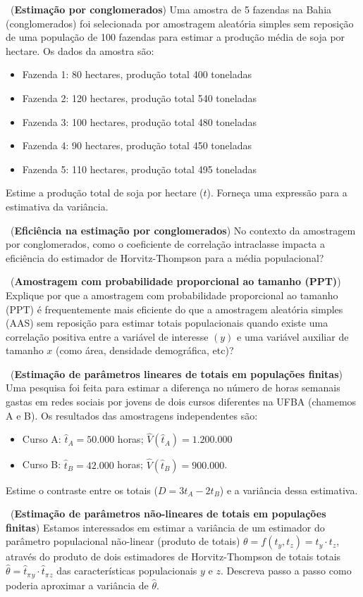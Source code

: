\documentclass[a4paper,12pt,oneside,twocolumn]{Config/milktest}
\begin{document}
\medskip 
\question~({\bf Estimação por conglomerados})
Uma amostra de 5 fazendas na Bahia (conglomerados) foi selecionada por amostragem aleatória simples sem reposição de uma população de 100 fazendas para estimar a produção média de soja por hectare. Os dados da amostra são:
\begin{itemize}
\item Fazenda 1: 80 hectares, produção total 400 toneladas
\item  Fazenda 2: 120 hectares, produção total 540 toneladas
\item Fazenda 3: 100 hectares, produção total 480 toneladas
\item Fazenda 4: 90 hectares, produção total 450 toneladas
\item Fazenda 5: 110 hectares, produção total 495 toneladas
\end{itemize}
Estime a produção total de soja por hectare ($\hat{t}$). Forneça uma expressão para a estimativa da variância. 

\medskip 
\question~({\bf Eficiência na estimação por conglomerados}) No contexto da amostragem por conglomerados, como o  
coeficiente de correlação intraclasse impacta a eficiência do estimador de Horvitz-Thompson para a média populacional?

\medskip 
\question~({\bf Amostragem com probabilidade proporcional ao tamanho (PPT)}) Explique por que a amostragem com probabilidade proporcional ao tamanho (PPT) é frequentemente mais eficiente do que a amostragem aleatória simples (AAS) sem reposição para estimar totais populacionais quando existe uma correlação positiva entre a variável de interesse $(y)$ e uma variável auxiliar de tamanho $x$ (como área, densidade demográfica, etc)?


\medskip 
\question~({\bf Estimação de parâmetros lineares de totais em populações finitas}) Uma pesquisa foi feita para estimar a diferença no número de horas semanais gastas em redes sociais por jovens de dois cursos diferentes na UFBA (chamemos A e B). Os resultados das amostragens independentes são:
\begin{itemize}   
\item Curso A: \(\widehat{t}_A = 50.000\) horas; \(\widehat{V}(\widehat{t}_A) = 1.200.000\)
\item Curso B: \(\widehat{t}_B = 42.000\) horas; \(\widehat{V}(\widehat{t}_B) = 900.000\).
\end{itemize}
Estime o contraste entre os totais (\(D = 3 t_A - 2 t_B\)) e a variância dessa estimativa.


\medskip 
\question~({\bf Estimação de parâmetros não-lineares de totais em populações finitas}) Estamos interessados em estimar a variância de um estimador do parâmetro populacional não-linear (produto de totais) $\theta=f(t_y,t_z)=t_y\cdot t_z$, através do produto de dois estimadores de Horvitz-Thompson de totais totais $\widehat{\theta} = {\widehat{t}_\pi}{_y} \cdot {\widehat{t}_\pi}{_z}$ das características populacionais $y$ e $z$.  Descreva 
passo a passo  como poderia aproximar a variância de $\hat{\theta}.$

\bigskip


\centering\color{cor}{\scshape boa prova}
\end{document}
